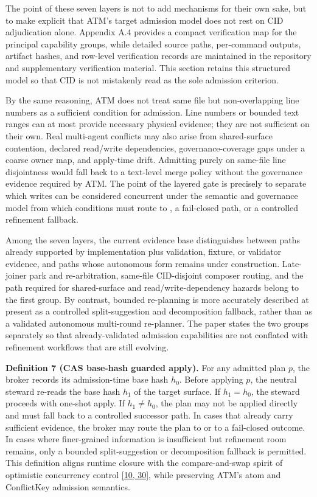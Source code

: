 \documentclass[9pt,letterpaper]{extarticle}
\begin{document}
The point of these seven layers is not to add mechanisms for their own sake, but to make explicit that ATM's target admission model does not rest on CID adjudication alone. Appendix A.4 provides a compact verification map for the principal capability groups, while detailed source paths, per-command outputs, artifact hashes, and row-level verification records are maintained in the repository and supplementary verification material. This section retains this structured model so that CID is not mistakenly read as the sole admission criterion.

By the same reasoning, ATM does not treat {}same file but non-overlapping line numbers{} as a sufficient condition for admission. Line numbers or bounded text ranges can at most provide necessary physical evidence; they are not sufficient on their own. Real multi-agent conflicts may also arise from shared-surface contention, declared read/write dependencies, governance-coverage gaps under a coarse owner map, and apply-time drift. Admitting purely on same-file line disjointness would fall back to a text-level merge policy without the governance evidence required by ATM. The point of the layered gate is precisely to separate which writes can be considered concurrent under the semantic and governance model from which conditions must route to \texttt{}, a fail-closed path, or a controlled refinement fallback.

Among the seven layers, the current evidence base distinguishes between paths already supported by implementation plus validation, fixture, or validator evidence, and paths whose autonomous form remains under construction. Late-joiner park and re-arbitration, same-file CID-disjoint composer routing, and the \texttt{} path required for shared-surface and read/write-dependency hazards belong to the first group. By contrast, bounded re-planning is more accurately described at present as a controlled split-suggestion and decomposition fallback, rather than as a validated autonomous multi-round re-planner. The paper states the two groups separately so that already-validated admission capabilities are not conflated with refinement workflows that are still evolving.

\textbf{Definition 7 (CAS base-hash guarded apply).} For any admitted plan $p$, the broker records its admission-time base hash $h_0$. Before applying $p$, the neutral steward re-reads the base hash $h_1$ of the target surface. If $h_1 = h_0$, the steward proceeds with one-shot apply. If $h_1 \neq h_0$, the plan may not be applied directly and must fall back to a controlled successor path. In cases that already carry sufficient evidence, the broker may route the plan to \texttt{} or to a fail-closed outcome. In cases where finer-grained information is insufficient but refinement room remains, only a bounded split-suggestion or decomposition fallback is permitted. This definition aligns runtime closure with the compare-and-swap spirit of optimistic concurrency control \textcolor{atmLinkBlue}{\hyperlink{Item.46}{[10, 30]}}, while preserving ATM's atom and ConflictKey admission semantics.
\end{document}
